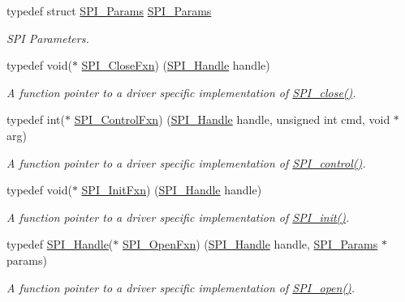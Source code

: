 \begin{DoxyCompactItemize}
typedef struct \hyperlink{struct_s_p_i___params}{S\+P\+I\+\_\+\+Params} \hyperlink{_s_p_i_8h_ae69b175346a856bdbb4ee6ed46b59a2f}{S\+P\+I\+\_\+\+Params}
\begin{DoxyCompactList}\small\item\em S\+P\+I Parameters. \end{DoxyCompactList}\item 
typedef void($\ast$ \hyperlink{_s_p_i_8h_aa361d580eb0a5a052d0a1403e0aa5746}{S\+P\+I\+\_\+\+Close\+Fxn}) (\hyperlink{_s_p_i_8h_a728806534c3c3e8675cfbfb7d8e36f13}{S\+P\+I\+\_\+\+Handle} handle)
\begin{DoxyCompactList}\small\item\em A function pointer to a driver specific implementation of \hyperlink{_s_p_i_8h_a0e3448b30b88609fa120915e49560601}{S\+P\+I\+\_\+close()}. \end{DoxyCompactList}\item 
typedef int($\ast$ \hyperlink{_s_p_i_8h_a48e6e65aa93fbcb2fd2c361e6ec25288}{S\+P\+I\+\_\+\+Control\+Fxn}) (\hyperlink{_s_p_i_8h_a728806534c3c3e8675cfbfb7d8e36f13}{S\+P\+I\+\_\+\+Handle} handle, unsigned int cmd, void $\ast$arg)
\begin{DoxyCompactList}\small\item\em A function pointer to a driver specific implementation of \hyperlink{_s_p_i_8h_ab9d3a23991be2741f382749d3844cc2f}{S\+P\+I\+\_\+control()}. \end{DoxyCompactList}\item 
typedef void($\ast$ \hyperlink{_s_p_i_8h_aa3b32db8f017fd0ce92bf46a089659e6}{S\+P\+I\+\_\+\+Init\+Fxn}) (\hyperlink{_s_p_i_8h_a728806534c3c3e8675cfbfb7d8e36f13}{S\+P\+I\+\_\+\+Handle} handle)
\begin{DoxyCompactList}\small\item\em A function pointer to a driver specific implementation of \hyperlink{_s_p_i_8h_afd9b09f58917f0e2d14c61b956eba214}{S\+P\+I\+\_\+init()}. \end{DoxyCompactList}\item 
typedef \hyperlink{_s_p_i_8h_a728806534c3c3e8675cfbfb7d8e36f13}{S\+P\+I\+\_\+\+Handle}($\ast$ \hyperlink{_s_p_i_8h_a7e0786f4c1487f9daec49adbc3ac1cf5}{S\+P\+I\+\_\+\+Open\+Fxn}) (\hyperlink{_s_p_i_8h_a728806534c3c3e8675cfbfb7d8e36f13}{S\+P\+I\+\_\+\+Handle} handle, \hyperlink{struct_s_p_i___params}{S\+P\+I\+\_\+\+Params} $\ast$params)
\begin{DoxyCompactList}\small\item\em A function pointer to a driver specific implementation of \hyperlink{_s_p_i_8h_a62cfe494cb1df47cd602e8747e894fd1}{S\+P\+I\+\_\+open()}. \end{DoxyCompactList}\item 

\end{DoxyCompactItemize}
